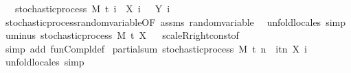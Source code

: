 \begin{isabellebody}
\ \ \ {\isachardoublequoteopen}stochastic{\isacharunderscore}{\kern0pt}process\ M\ t\ {\isacharparenleft}{\kern0pt}{\isasymlambda}i\ {\isasymxi}{\isachardot}{\kern0pt}\ X\ i\ {\isasymxi}\ {\isacharminus}{\kern0pt}\ Y\ i\ {\isasymxi}{\isacharparenright}{\kern0pt}{\isachardoublequoteclose}\isanewline
%
\isadelimproof
\ \ %
\endisadelimproof
%
\isatagproof
{}\isamarkupfalse%
\ stochastic{\isacharunderscore}{\kern0pt}process{\isachardot}{\kern0pt}random{\isacharunderscore}{\kern0pt}variable{\isacharbrackleft}{\kern0pt}OF\ assms{\isacharbrackright}{\kern0pt}\ random{\isacharunderscore}{\kern0pt}variable\ \isamarkupfalse%
\ {\isacharparenleft}{\kern0pt}unfold{\isacharunderscore}{\kern0pt}locales{\isacharparenright}{\kern0pt}\ simp%
\endisatagproof
{\isafoldproof}%
%
\isadelimproof
\isanewline
%
\endisadelimproof
\isanewline
\isanewline
{}\isamarkupfalse%
\ uminus{\isacharcolon}{\kern0pt}\ {\isachardoublequoteopen}stochastic{\isacharunderscore}{\kern0pt}process\ M\ t\ {\isacharparenleft}{\kern0pt}{\isacharminus}{\kern0pt}X{\isacharparenright}{\kern0pt}{\isachardoublequoteclose}%
\isadelimproof
\ %
\endisadelimproof
%
\isatagproof
{}\isamarkupfalse%
\ scaleR{\isacharunderscore}{\kern0pt}right{\isacharunderscore}{\kern0pt}const{\isacharbrackleft}{\kern0pt}of\ {\isachardoublequoteopen}{\isasymlambda}{\isacharunderscore}{\kern0pt}{\isachardot}{\kern0pt}\ {\isacharminus}{\kern0pt}{}{\isachardoublequoteclose}{\isacharbrackright}{\kern0pt}\ \isamarkupfalse%
\ {\isacharparenleft}{\kern0pt}simp\ add{\isacharcolon}{\kern0pt}\ fun{\isacharunderscore}{\kern0pt}Compl{\isacharunderscore}{\kern0pt}def{\isacharparenright}{\kern0pt}%
\endisatagproof
{\isafoldproof}%
%
\isadelimproof
%
\endisadelimproof
\isanewline
\isanewline
{}\isamarkupfalse%
\ partial{\isacharunderscore}{\kern0pt}sum{\isacharcolon}{\kern0pt}\ {\isachardoublequoteopen}stochastic{\isacharunderscore}{\kern0pt}process\ M\ t\ {\isacharparenleft}{\kern0pt}{\isasymlambda}n\ {\isasymxi}{\isachardot}{\kern0pt}\ {\isasymSum}i{\isasymin}{\isacharbraceleft}{\kern0pt}tn{\isacharbraceright}{\kern0pt}{\isachardot}{\kern0pt}\ X\ i\ {\isasymxi}{\isacharparenright}{\kern0pt}{\isachardoublequoteclose}%
\isadelimproof
\ %
\endisadelimproof
%
\isatagproof
{}\isamarkupfalse%
\ {\isacharparenleft}{\kern0pt}unfold{\isacharunderscore}{\kern0pt}locales{\isacharparenright}{\kern0pt}\ simp%

\end{isabellebody}
